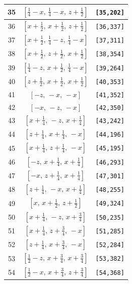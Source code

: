 \documentclass[fleqn,8pt]{jsarticle}
\begin{document}
\begin{longtable}{ccc}
35 & $\left[ \frac{1}{4} - x,\, \frac{1}{4} - x,\, z + \frac{1}{2} \right]$ & {\tt [35,202]} \\ \hline
36 & $\left[ x + \frac{1}{2},\, x + \frac{1}{2},\, z + \frac{1}{2} \right]$ & {\tt [36,337]} \\ \hline
37 & $\left[ x + \frac{1}{2},\, \frac{1}{4} - z,\, \frac{1}{4} - x \right]$ & {\tt [37,311]} \\ \hline
38 & $\left[ x + \frac{1}{2},\, z + \frac{1}{2},\, x + \frac{1}{2} \right]$ & {\tt [38,354]} \\ \hline
39 & $\left[ \frac{1}{4} - z,\, x + \frac{1}{2},\, \frac{1}{4} - x \right]$ & {\tt [39,264]} \\ \hline
40 & $\left[ z + \frac{1}{2},\, x + \frac{1}{2},\, x + \frac{1}{2} \right]$ & {\tt [40,353]} \\ \hline
41 & $\left[ - z,\, - x,\, - x \right]$ & {\tt [41,352]} \\ \hline
42 & $\left[ - x,\, - z,\, - x \right]$ & {\tt [42,350]} \\ \hline
43 & $\left[ x + \frac{1}{4},\, - z,\, x + \frac{1}{4} \right]$ & {\tt [43,242]} \\ \hline
44 & $\left[ z + \frac{1}{4},\, x + \frac{1}{4},\, - x \right]$ & {\tt [44,196]} \\ \hline
45 & $\left[ x + \frac{1}{4},\, z + \frac{1}{4},\, - x \right]$ & {\tt [45,195]} \\ \hline
46 & $\left[ - z,\, x + \frac{1}{4},\, x + \frac{1}{4} \right]$ & {\tt [46,293]} \\ \hline
47 & $\left[ - x,\, z + \frac{1}{4},\, x + \frac{1}{4} \right]$ & {\tt [47,301]} \\ \hline
48 & $\left[ z + \frac{1}{4},\, - x,\, x + \frac{1}{4} \right]$ & {\tt [48,255]} \\ \hline
49 & $\left[ x,\, x + \frac{1}{2},\, z + \frac{1}{2} \right]$ & {\tt [49,324]} \\ \hline
50 & $\left[ x + \frac{1}{4},\, - z,\, x + \frac{3}{4} \right]$ & {\tt [50,235]} \\ \hline
51 & $\left[ x + \frac{1}{4},\, z + \frac{3}{4},\, - x \right]$ & {\tt [51,285]} \\ \hline
52 & $\left[ z + \frac{1}{4},\, x + \frac{3}{4},\, - x \right]$ & {\tt [52,284]} \\ \hline
53 & $\left[ \frac{1}{2} - z,\, x + \frac{3}{4},\, x + \frac{3}{4} \right]$ & {\tt [53,382]} \\ \hline
54 & $\left[ \frac{1}{2} - x,\, x + \frac{3}{4},\, z + \frac{3}{4} \right]$ & {\tt [54,368]} \\ \hline

\end{longtable}
\end{document}
